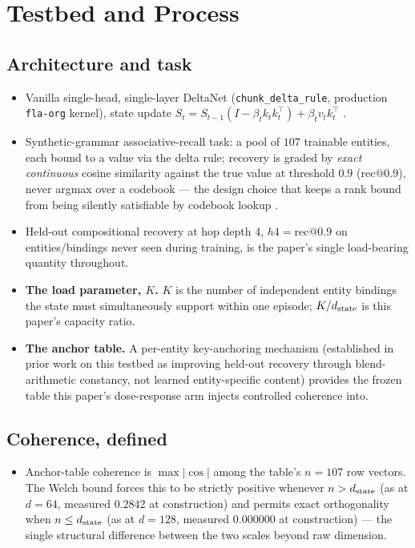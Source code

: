\section{Testbed and Process}
\label{sec:method}

\subsection{Architecture and task}
\begin{itemize}
  \item Vanilla single-head, single-layer DeltaNet (\texttt{chunk\_delta\_rule},
    production \texttt{fla-org} kernel), state update $S_t = S_{t-1}(I -
    \beta_t k_t k_t^\top) + \beta_t v_t k_t^\top$ \citep{schlag2021linear}.
  \item Synthetic-grammar associative-recall task: a pool of $107$ trainable
    entities, each bound to a value via the delta rule; recovery is graded by
    \emph{exact continuous} cosine similarity against the true value at
    threshold $0.9$ ($\mathrm{rec@0.9}$), never argmax over a codebook ---
    the design choice that keeps a rank bound from being silently satisfiable
    by codebook lookup \citep{nichani2025factual}.
  \item Held-out compositional recovery at hop depth 4, $h4 =
    \mathrm{rec@0.9}$ on entities/bindings never seen during training, is
    the paper's single load-bearing quantity throughout.
  \item \textbf{The load parameter, $K$.} $K$ is the number of independent
    entity bindings the state must simultaneously support within one
    episode; $K/d_{\mathrm{state}}$ is this paper's capacity ratio.
  \item \textbf{The anchor table.} A per-entity key-anchoring mechanism
    (established in prior work on this testbed as improving held-out
    recovery through blend-arithmetic constancy, not learned entity-specific
    content) provides the frozen table this paper's dose-response arm
    injects controlled coherence into.
\end{itemize}

\subsection{Coherence, defined}
\begin{itemize}
  \item Anchor-table coherence is $\max|\cos|$ among the table's $n=107$
    row vectors. The Welch bound forces this to be strictly positive
    whenever $n > d_{\mathrm{state}}$ (as at $d=64$, measured $0.2842$ at
    construction) and permits exact orthogonality when $n \leq d_{\mathrm{state}}$
    (as at $d=128$, measured $0.000000$ at construction) --- the single
    structural difference between the two scales beyond raw dimension.
\end{itemize}

